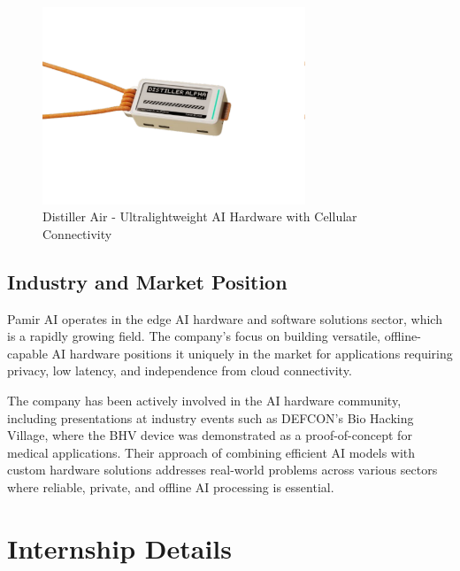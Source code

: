 \documentclass[12pt,a4paper]{report}
\begin{document}
\vspace{0.5cm}

\begin{figure}[htbp]
    \centering
    \includegraphics[width=0.7\textwidth]{distiller_air.pdf}
    \caption{Distiller Air - Ultralightweight AI Hardware with Cellular Connectivity}
\end{figure}

\section{Industry and Market Position}

Pamir AI operates in the edge AI hardware and software solutions sector, which is a rapidly growing field. The company's focus on building versatile, offline-capable AI hardware positions it uniquely in the market for applications requiring privacy, low latency, and independence from cloud connectivity.

\vspace{0.3cm}

The company has been actively involved in the AI hardware community, including presentations at industry events such as DEFCON's Bio Hacking Village, where the BHV device was demonstrated as a proof-of-concept for medical applications. Their approach of combining efficient AI models with custom hardware solutions addresses real-world problems across various sectors where reliable, private, and offline AI processing is essential.

\chapter{Internship Details}
\end{document}
